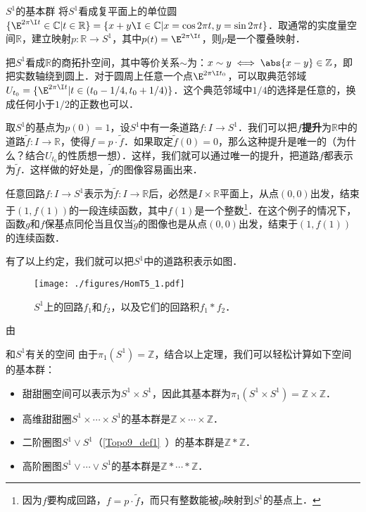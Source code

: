 
\begin{example}{$S^1$的基本群}
将$S^1$看成复平面上的单位圆$\{\E^{2\pi\I t}\in\mathbb{C}|t\in\mathbb{R}\}=\{x+y\I\in\mathbb{C}|x=\cos{2\pi t}, y=\sin{2\pi t}\}$．取通常的实度量空间$\mathbb{R}$，建立映射$p:\mathbb{R}\rightarrow S^1$，其中$p(t)=\E^{2\pi\I t}$，则$p$是一个覆叠映射．

把$S^1$看成$\mathbb{R}$的商拓扑空间，其中等价关系$\sim$为：$x\sim y\iff \abs{x-y}\in\mathbb{Z}$，即把实数轴绕到圆上．对于圆周上任意一个点$\E^{2\pi\I t_0}$，可以取典范邻域$U_{t_0}=\{\E^{2\pi\I t}|t\in(t_0-1/4, t_0+1/4)\}$．这个典范邻域中$1/4$的选择是任意的，换成任何小于$1/2$的正数也可以．

取$S^1$的基点为$p(0)=1$，设$S^1$中有一条道路$f:I\rightarrow S^1$．我们可以把$f$\textbf{提升}为$\mathbb{R}$中的道路$\tilde{f}:I\rightarrow\mathbb{R}$，使得$f=p\cdot\tilde{f}$．如果取定$\tilde{f}(0)=0$，那么这种提升是唯一的（为什么？结合$U_{t_0}$的性质想一想）．这样，我们就可以通过唯一的提升，把道路$f$都表示为$\tilde{f}$．这样做的好处是，$\tilde{f}$的图像容易画出来．

任意回路$f:I\rightarrow S^1$表示为$\tilde{f}:I\rightarrow\mathbb{R}$后，必然是$I\times\mathbb{R}$平面上，从点$(0, 0)$出发，结束于$(1, f(1))$的一段连续函数，其中$f(1)$是一个整数\footnote{因为$f$要构成回路，$f=p\cdot\tilde{f}$，而只有整数能被$p$映射到$S^1$的基点上．}．在这个例子的情况下，函数$g$和$f$保基点同伦当且仅当$\tilde{g}$的图像也是从点$(0, 0)$出发，结束于$(1, f(1))$的连续函数．

有了以上约定，我们就可以把$S^1$中的道路积表示如图．

\begin{figure}[ht]
\centering
\texttt{[image: ./figures/HomT5\_1.pdf]}
\caption{$S^1$上的回路$f_1$和$f_2$，以及它们的回路积$f_1*f_2$．} \label{HomT5_fig1}
\end{figure}

由

\end{example}

\begin{example}{和$S^1$有关的空间}
由于$\pi_1(S^1)=\mathbb{Z}$，结合以上定理，我们可以轻松计算如下空间的基本群：
\begin{itemize}
\item 甜甜圈空间可以表示为$S^1\times S^1$，因此其基本群为$\pi_1(S^1\times S^1)=\mathbb{Z}\times\mathbb{Z}$．
\item 高维甜甜圈$S^1\times\cdots\times S^1$的基本群是$\mathbb{Z}\times\cdots\times\mathbb{Z}$．
\item 二阶圈图$S^1\vee S^1$（\autoref{Topo9_def1}~）的基本群是$\mathbb{Z}*\mathbb{Z}$．
\item 高阶圈图$S^1\vee\cdots\vee S^1$的基本群是$\mathbb{Z}*\cdots*\mathbb{Z}$．
\end{itemize}

\end{example}



